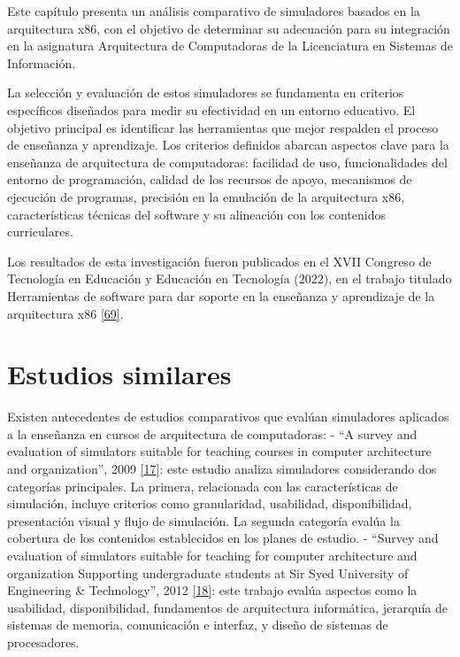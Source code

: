 \documentclass[12pt,oneside]{templates/unerthesis}
\begin{document}
Este capítulo presenta un análisis comparativo de simuladores basados en la arquitectura x86, con el objetivo de determinar su adecuación para su integración en la asignatura Arquitectura de Computadoras de la Licenciatura en Sistemas de Información.

La selección y evaluación de estos simuladores se fundamenta en criterios específicos diseñados para medir su efectividad en un entorno educativo. El objetivo principal es identificar las herramientas que mejor respalden el proceso de enseñanza y aprendizaje. Los criterios definidos abarcan aspectos clave para la enseñanza de arquitectura de computadoras: facilidad de uso, funcionalidades del entorno de programación, calidad de los recursos de apoyo, mecanismos de ejecución de programas, precisión en la emulación de la arquitectura x86, características técnicas del software y su alineación con los contenidos curriculares.

Los resultados de esta investigación fueron publicados en el XVII Congreso de Tecnología en Educación y Educación en Tecnología (2022), en el trabajo titulado Herramientas de software para dar soporte en la enseñanza y aprendizaje de la arquitectura x86 \protect\hyperlink{ref-colombani_herramientas_2022}{{[}69{]}}.

\hypertarget{estudios-similares}{%
\section{Estudios similares}\label{estudios-similares}}

Existen antecedentes de estudios comparativos que evalúan simuladores aplicados a la enseñanza en cursos de arquitectura de computadoras:
- ``A survey and evaluation of simulators suitable for teaching courses in computer architecture and organization'', 2009 \protect\hyperlink{ref-nikolic_survey_2009}{{[}17{]}}: este estudio analiza simuladores considerando dos categorías principales. La primera, relacionada con las características de simulación, incluye criterios como granularidad, usabilidad, disponibilidad, presentación visual y flujo de simulación. La segunda categoría evalúa la cobertura de los contenidos establecidos en los planes de estudio.
- ``Survey and evaluation of simulators suitable for teaching for computer architecture and organization Supporting undergraduate students at Sir Syed University of Engineering \& Technology'', 2012 \protect\hyperlink{ref-hasan_survey_2012}{{[}18{]}}: este trabajo evalúa aspectos como la usabilidad, disponibilidad, fundamentos de arquitectura informática, jerarquía de sistemas de memoria, comunicación e interfaz, y diseño de sistemas de procesadores.
\end{document}
